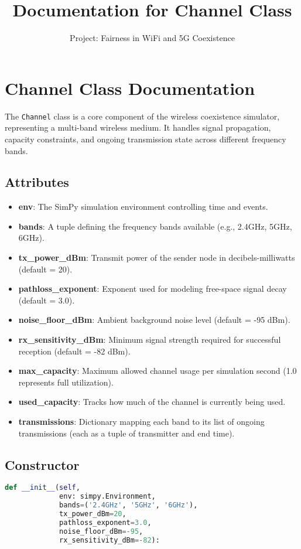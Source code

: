 \documentclass[12pt]{article}
\title{Documentation for Channel Class}
\author{Project: Fairness in WiFi and 5G Coexistence}
\date{}
\begin{document}
\maketitle

\section{Channel Class Documentation}
\label{sec:channel}

The \texttt{Channel} class is a core component of the wireless coexistence simulator, representing a multi-band wireless medium. It handles signal propagation, capacity constraints, and ongoing transmission state across different frequency bands.

\subsection*{Attributes}
\begin{itemize}
  \item \textbf{env}: The SimPy simulation environment controlling time and events.
  \item \textbf{bands}: A tuple defining the frequency bands available (e.g., 2.4GHz, 5GHz, 6GHz).
  \item \textbf{tx\_power\_dBm}: Transmit power of the sender node in decibels-milliwatts (default = 20).
  \item \textbf{pathloss\_exponent}: Exponent used for modeling free-space signal decay (default = 3.0).
  \item \textbf{noise\_floor\_dBm}: Ambient background noise level (default = -95 dBm).
  \item \textbf{rx\_sensitivity\_dBm}: Minimum signal strength required for successful reception (default = -82 dBm).
  \item \textbf{max\_capacity}: Maximum allowed channel usage per simulation second (1.0 represents full utilization).
  \item \textbf{used\_capacity}: Tracks how much of the channel is currently being used.
  \item \textbf{transmissions}: Dictionary mapping each band to its list of ongoing transmissions (each as a tuple of transmitter and end time).
\end{itemize}

\subsection*{Constructor}
\begin{lstlisting}[language=Python]
def __init__(self,
             env: simpy.Environment,
             bands=('2.4GHz', '5GHz', '6GHz'),
             tx_power_dBm=20,
             pathloss_exponent=3.0,
             noise_floor_dBm=-95,
             rx_sensitivity_dBm=-82):
\end{lstlisting}
\end{document}
